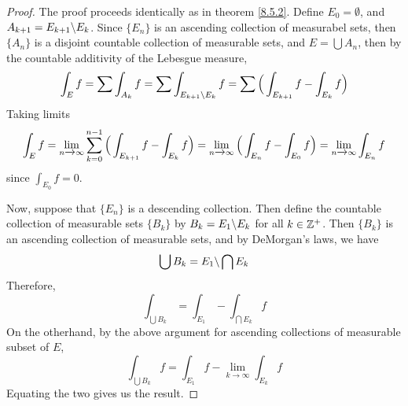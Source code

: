 \begin{proof}
    The proof proceeds identically as in theorem \ref{8.5.2}. Define
    $E_0=\emptyset$, and $A_{k+1}=E_{k+1} \backslash E_k$. Since $\{E_n\}$ is an
    ascending collection of measurabel sets, then $\{A_n\}$ is a disjoint
    countable collection of measurable sets, and $E=\bigcup{A_n}$, then by the
    countable additivity of the Lebesgue measure,
    \begin{equation*}
        \int_E{f}=\sum{\int_{A_k}{f}}=
        \sum{\int_{E_{k+1} \backslash E_k}{f}}=
        \sum{\Big{(} \int_{E_{k+1}}{f}-\int_{E_k}{f} \Big{)}}
    \end{equation*}
    Taking limits
    \begin{equation*}
        \int_E{f}=
        \lim_{n \xrightarrow{} \infty}
                {\sum_{k=0}^{n-1}{\Big{(} \int_{E_{k+1}}{f}-\int_{E_k}{f} \Big{)}}}=
                \lim_{n \xrightarrow{} \infty}
                    {\Big{(} \int_{E_n}{f}-\int_{E_0}{f} \Big{)}}=
                \lim_{n \xrightarrow{} \infty}{\int_{E_n}{f}}
    \end{equation*}
    since $\int_{E_0}{f}=0$.

    Now, suppose that $\{E_n\}$ is a descending collection. Then define the
    countable collection of measurable sets $\{B_k\}$ by $B_k=E_1 \backslash E_k$
    for all $k \in \mathbb{Z}^+$. Then $\{B_k\}$ is an ascending collection of
    measurable sets, and by DeMorgan's laws, we have
    \begin{equation*}
        \bigcup{B_k}=E_1 \backslash \bigcap{E_k}
    \end{equation*}
    Therefore,
    \begin{equation*}
        \int_{\bigcup{B_k}}=\int_{E_1}-\int_{\bigcap{E_k}}{f}
    \end{equation*}
    On the otherhand, by the above argument for ascending collections of
    measurable subset of $E$,
    \begin{equation*}
        \int_{\bigcup{B_k}}{f}=
        \int_{E_1}{f}-\lim_{k \xrightarrow{} \infty}{\int_{E_k}{f}}
    \end{equation*}
    Equating the two gives us the result.
\end{proof}

